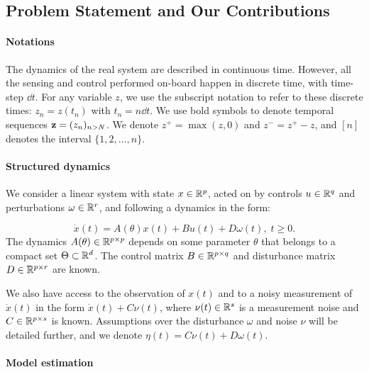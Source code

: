 \documentclass{article}
\begin{document}
\subsection{Problem Statement and Our Contributions}

\paragraph{Notations}

The dynamics of the real system are described in continuous time. However, all the sensing and control performed on-board happen in discrete time, with time-step $\dd t$. For any variable $z$, we use the subscript notation to refer to these discrete times: $z_n = z(t_n)$ with $t_n = n\dd t$. We use bold symbols to denote temporal sequences $\mathbf{z} = (z_n)_{n>N}$. We denote $z^+ = \max(z,0)$ and $z^- = z^+-z$, and $[n]$ denotes the interval $\{1,2,\dots, n\}$.

\paragraph{Structured dynamics}
We consider a linear system with state $x\in\mathbb{R}^p$, acted on by controls $u\in\mathbb{R}^q$ and perturbations $\omega\in\mathbb{R}^r$, and following a dynamics in the form:

\begin{equation}
\label{eq:dynamics}
\dot{x}(t)=A(\theta)x(t) + B u(t) + D \omega(t),\;t\geq0.
\end{equation}
The dynamics $A(\theta)\in\mathbb{R}^{p\times p}$  depends on some parameter $\theta$ that belongs to a compact set $\Theta \subset \mathbb{R}^d$. The control matrix $B\in\mathbb{R}^{p\times q}$ and disturbance matrix $D\in\mathbb{R}^{p\times r}$ are known.

We also have access to the observation of $x(t)$ and to a noisy measurement of $\dot{x}(t)$ in the form $\dot{x}(t) + C\nu(t)$, where $\nu(t)\in\mathbb{R}^s$ is a measurement noise and $C\in\mathbb{R}^{p\times s}$ is known. Assumptions over the disturbance $\omega$ and noise $\nu$ will be detailed further, and we denote $\eta(t) = C\nu(t) + D\omega(t)$.

\paragraph{Model estimation}
\end{document}
